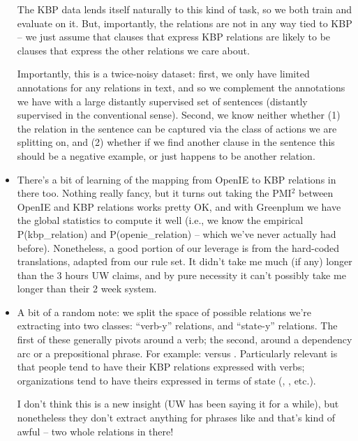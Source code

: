 \begin{itemize}
    The KBP data lends itself naturally to this kind of task, so we both
    train and evaluate on it. But, importantly, the relations are not
    in any way tied to KBP -- we just assume that clauses that express
    KBP relations are likely to be clauses that express the other relations
    we care about.

    Importantly, this is a twice-noisy dataset: first, we only have limited
    annotations for any relations in text, and so we complement the annotations
    we have with a large distantly supervised set of sentences (distantly supervised
    in the conventional sense).
    Second, we know neither whether (1) the relation in the sentence can be captured
    via the class of actions we are splitting on, and (2) whether if we find another
    clause in the sentence this should be a negative example, or just happens to be
    another relation.

  \item There's a bit of learning of the mapping from OpenIE to KBP
    relations in there too. Nothing really fancy, but it turns out
    taking the PMI$^2$ between OpenIE and KBP relations works pretty OK,
    and with Greenplum we have the global statistics to compute it well
    (i.e., we know the empirical P(kbp\_relation) and P(openie\_relation) --
    which we've never actually had before).
    Nonetheless, a good portion of our leverage is from the hard-coded
    translations, adapted from our rule set.
    It didn't take me much (if any) longer than the 3 hours UW claims,
    and by pure necessity it can't possibly take me longer than their
    2 week system.
  
  \item A bit of a random note: 
      we split the space of possible relations we're extracting into two classes:
      ``verb-y'' relations, and ``state-y'' relations. The first of these
      generally pivots around a verb; the second, around a dependency
      arc or a prepositional phrase. For example:
       versus
      .
      Particularly relevant is that people tend to have their KBP relations
      expressed with verbs; organizations tend to have theirs expressed
      in terms of state (,
      , etc.).

      I don't think this is a new insight (UW has been saying it for 
      a while), but nonetheless they don't extract anything for phrases
      like  and that's kind of awful -- two
      whole relations in there!
\end{itemize}

